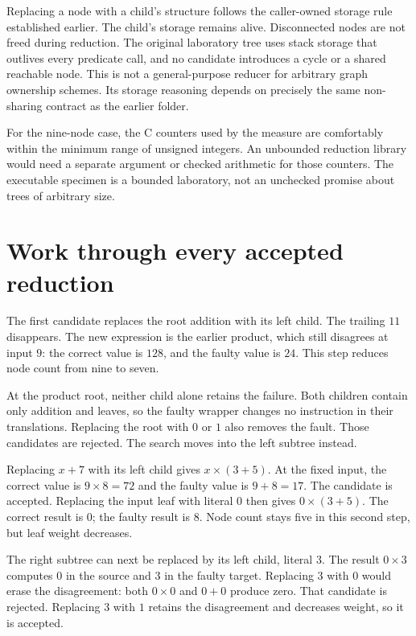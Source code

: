 Replacing a node with a child's structure follows the caller-owned storage rule established earlier.
The child's storage remains alive.
Disconnected nodes are not freed during reduction.
The original laboratory tree uses stack storage that outlives every predicate call, and no candidate introduces a cycle or a shared reachable node.
This is not a general-purpose reducer for arbitrary graph ownership schemes.
Its storage reasoning depends on precisely the same non-sharing contract as the earlier folder.

For the nine-node case, the C counters used by the measure are comfortably within the minimum range of unsigned integers.
An unbounded reduction library would need a separate argument or checked arithmetic for those counters.
The executable specimen is a bounded laboratory, not an unchecked promise about trees of arbitrary size.

\section{Work through every accepted reduction}
\label{sec:tiny-reduction-walkthrough}

The first candidate replaces the root addition with its left child.
The trailing $11$ disappears.
The new expression is the earlier product, which still disagrees at input $9$: the correct value is $128$, and the faulty value is $24$.
This step reduces node count from nine to seven.

At the product root, neither child alone retains the failure.
Both children contain only addition and leaves, so the faulty wrapper changes no instruction in their translations.
Replacing the root with $0$ or $1$ also removes the fault.
Those candidates are rejected.
The search moves into the left subtree instead.

Replacing $x+7$ with its left child gives $x\times(3+5)$.
At the fixed input, the correct value is $9\times8=72$ and the faulty value is $9+8=17$.
The candidate is accepted.
Replacing the input leaf with literal $0$ then gives $0\times(3+5)$.
The correct result is $0$; the faulty result is $8$.
Node count stays five in this second step, but leaf weight decreases.

The right subtree can next be replaced by its left child, literal $3$.
The result $0\times3$ computes $0$ in the source and $3$ in the faulty target.
Replacing $3$ with $0$ would erase the disagreement: both $0\times0$ and $0+0$ produce zero.
That candidate is rejected.
Replacing $3$ with $1$ retains the disagreement and decreases weight, so it is accepted.

